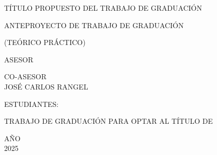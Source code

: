 \newpage
{\bfseries \centering
\Universidad

\Facultad

\vspace{2em}

TÍTULO PROPUESTO DEL TRABAJO DE GRADUACIÓN

\Proyecto

\vspace{2em}

ANTEPROYECTO DE TRABAJO DE GRADUACIÓN

(TEÓRICO PRÁCTICO)

\vspace{3em}

ASESOR \\ \Asesor


\vspace{2em}

CO-ASESOR \\ JOSÉ CARLOS RANGEL

\vspace{2em}

ESTUDIANTES:

\Elbin

\cedulaep

\Arland

\cedulaab

\vspace{2em}

TRABAJO DE GRADUACIÓN PARA OPTAR AL TÍTULO DE \\
\Titulo

\vspace{4em}

AÑO \\ 2025

}
